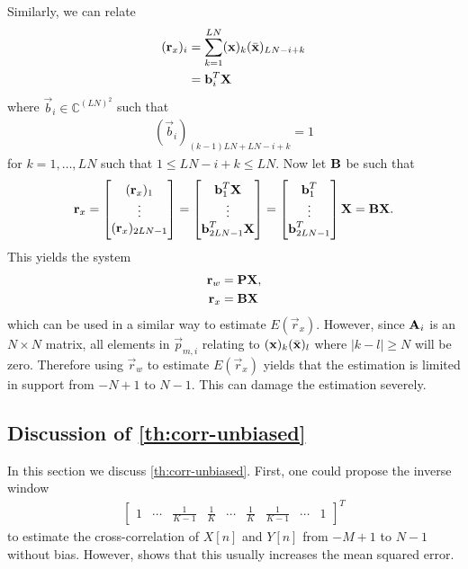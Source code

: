 \documentclass[a4paper, openany, oneside]{memoir}
\begin{document}
Similarly, we can relate
\begin{align*}
    (\boldsymbol{\mathbf{r}}_x)_i &= \sum_{k=1}^{LN}(\boldsymbol{\mathbf{x}})_k (\bar{\boldsymbol{\mathbf{x}}})_{LN-i+k} \\
    &= \boldsymbol{\mathbf{b}}_i^T \boldsymbol{\mathbf{X}}
\end{align*}
where $\vec{b}_i \in \mathbb{C}^{(LN)^2}$ such that
\begin{align*}
    (\vec{b}_i)_{(k-1)LN+LN-i+k} = 1
\end{align*}
for $k = 1,\ldots,LN$ such that $1 \le LN-i+k \le LN$. Now let $\boldsymbol{\mathbf{B}}$ be such that
\begin{align*}
    \boldsymbol{\mathbf{r}}_x = \begin{bmatrix}
        (\boldsymbol{\mathbf{r}}_x)_1 \\
        \vdots \\
        (\boldsymbol{\mathbf{r}}_x)_{2LN-1}
    \end{bmatrix} = \begin{bmatrix}
        \boldsymbol{\mathbf{b}}_1^T \boldsymbol{\mathbf{X}} \\
        \vdots \\
        \boldsymbol{\mathbf{b}}_{2LN-1}^T \boldsymbol{\mathbf{X}}
    \end{bmatrix} = \begin{bmatrix}
        \boldsymbol{\mathbf{b}}_1^T \\
        \vdots \\
        \boldsymbol{\mathbf{b}}_{2LN-1}^T
    \end{bmatrix} \boldsymbol{\mathbf{X}} = \boldsymbol{\mathbf{B}} \boldsymbol{\mathbf{X}}.
\end{align*}
This yields the system
\begin{align*}
    \boldsymbol{\mathbf{r}}_w &= \boldsymbol{\mathbf{P}} \boldsymbol{\mathbf{X}}, \\
    \boldsymbol{\mathbf{r}}_x &= \boldsymbol{\mathbf{B}} \boldsymbol{\mathbf{X}}
\end{align*}
which can be used in a similar way to estimate $E(\vec{r}_x)$. However, since $\boldsymbol{\mathbf{A}}_i$ is an $N \times N$ matrix, all elements in $\vec{p}_{m,i}$ relating to $(\boldsymbol{\mathbf{x}})_k (\bar{\boldsymbol{\mathbf{x}}})_l$ where $|k - l| \ge N$ will be zero. Therefore using $\vec{r}_w$ to estimate $E(\vec{r}_x)$ yields that the estimation is limited in support from $-N+1$ to $N-1$. This can damage the estimation severely.

\subsection{Discussion of \cref{th:corr-unbiased}}
In this section we discuss \cref{th:corr-unbiased}. First, one could propose the inverse window
\begin{align*}
    \begin{bmatrix}
        1 & \cdots & \frac{1}{K-1} & \frac{1}{K} & \cdots & \frac{1}{K} & \frac{1}{K-1} & \cdots & 1
    \end{bmatrix}^T
\end{align*}
to estimate the cross-correlation of $X[n]$ and $Y[n]$ from $-M+1$ to $N-1$ without bias. However, \cite{percival1993univariate} shows that this usually increases the mean squared error.
\end{document}

